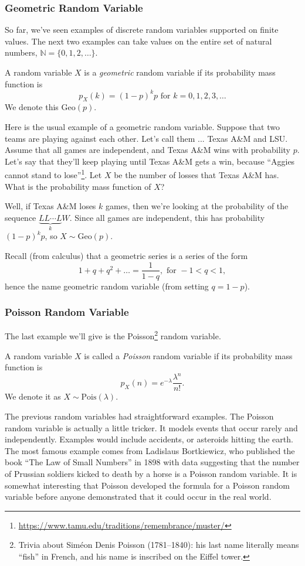 \documentclass{ximera}
\begin{document}
\subsubsection{Geometric Random Variable}
So far, we've seen examples of discrete random variables supported on finite values. The next two examples can take values on the entire set of natural numbers, $\mathbb{N}=\{0,1,2,\ldots\}$.
\begin{definition}
A random variable $X$ is a \textit{geometric} random variable if its probability mass function is
$$
p_X(k) = (1-p)^k p \text{ for } k=0,1,2,3,\ldots
$$
We denote this Geo$(p)$.
\end{definition}

Here is the usual example of a geometric random variable. Suppose that two teams are playing against each other. Let's call them ... Texas A\&M and LSU. Assume that all games are independent, and Texas A\&M wins with probability $p$. Let's say that they'll keep playing until Texas A\&M gets a win, because ``Aggies cannot stand to lose''\footnote{\url{https://www.tamu.edu/traditions/remembrance/muster/}}. Let $X$ be the number of losses that Texas A\&M has. What is the probability mass function of $X$? 

Well, if Texas A\&M loses $k$ games, then we're looking at the probability of the sequence $\underbrace{LL \cdots L}_{k}W$. Since all games are independent, this has probability $(1-p)^kp$, so $X\sim \text{Geo}(p)$.

Recall (from calculus) that a geometric series is a series of the form
$$
1+q+q^2 + \ldots = \frac{1}{1-q}, \text{ for } -1<q<1,
$$
hence the name geometric random variable (from setting $q=1-p$).

\subsubsection{Poisson Random Variable}
The last example we'll give is the Poisson\footnote{Trivia about Sim\'{e}on Denis Poisson (1781--1840): his last name literally means ``fish'' in French, and his name is inscribed on the Eiffel tower.} random variable.

\begin{definition}
A random variable $X$ is called a \textit{Poisson} random variable if its probability mass function is
$$
p_X(n) = e^{-\lambda} \frac{\lambda^n}{n!}.
$$
We denote it as $X\sim \text{Pois}(\lambda)$.
\end{definition}

The previous random variables had straightforward examples. The Poisson random variable is actually a little tricker. It models events that occur rarely and independently. Examples would include accidents, or asteroids hitting the earth. The most famous example comes from Ladislaus Bortkiewicz, who published the book ``The Law of Small Numbers'' in 1898 with data suggesting that the number of Prussian soldiers kicked to death by a horse is a Poisson random variable. It is somewhat interesting that Poisson developed the formula for a Poisson random variable before anyone demonstrated that it could occur in the real world. 
\end{document}
